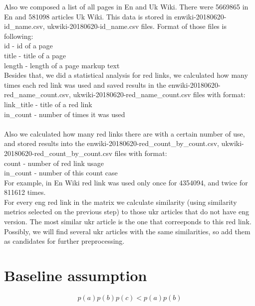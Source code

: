\documentclass[11pt,a4paper]{article}
\begin{document}
Also we composed a list of all pages in En and Uk Wiki. There were 5669865 in En and 581098 articles Uk Wiki. This data is stored in enwiki-20180620-id\_name.csv, ukwiki-20180620-id\_name.csv files. Format of those files is following:\\ 
id - id of a page\\
title - title of a page\\
length - length of a page markup text\\

Besides that, we did a statistical analysis for red links, we calculated how many times each red link was used and saved results in the enwiki-20180620-red\_name\_count.csv, ukwiki-20180620-red\_name\_count.csv files with format:\\
link\_title - title of a red link\\
in\_count - number of times it was used\\
\\
Also we calculated how many red links there are with a certain number of use, and stored results into the enwiki-20180620-red\_count\_by\_count.csv, ukwiki-20180620-red\_count\_by\_count.csv files with format:\\
count - number of red link usage\\
in\_count - number of this count case\\

For example, in En Wiki red link was used only once for 4354094, and twice for 811612 times.\\

For every eng red link in the matrix we calculate similarity (using similarity metrics selected on the previous step) to those ukr articles that do not have eng version. The most similar ukr article is the one that correeponds to this red link. Possibly, we will find several ukr articles with the same similarities, so add them as candidates for further preprocessing.

\section{Baseline assumption}

\[ p(a)p(b)p(c) < p(a)p(b) \]
\end{document}
